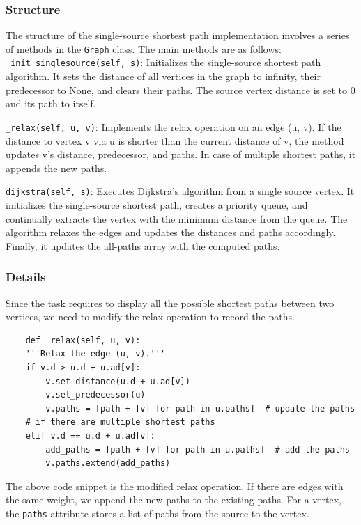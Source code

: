 \documentclass[UTF8]{ctexart}
\begin{document}
\subsubsection*{Structure}
The structure of the single-source shortest path implementation involves a series of methods in the \texttt{Graph} class.
The main methods are as follows:\\
\texttt{\_init\_singlesource(self, s)}: Initializes the single-source shortest path algorithm. It sets the distance of all vertices in the graph to infinity, their predecessor to None, and clears their paths. The source vertex distance is set to 0 and its path to itself.

\texttt{\_relax(self, u, v)}: Implements the relax operation on an edge (u, v). If the distance to vertex v via u is shorter than the current distance of v, the method updates v's distance, predecessor, and paths. In case of multiple shortest paths, it appends the new paths.

\texttt{dijkstra(self, s)}: Executes Dijkstra's algorithm from a single source vertex. It initializes the single-source shortest path, creates a priority queue, and continually extracts the vertex with the minimum distance from the queue. The algorithm relaxes the edges and updates the distances and paths accordingly. Finally, it updates the all-paths array with the computed paths.

\subsubsection*{Details}

Since the task requires to display all the possible shortest paths between two vertices, we need to modify the relax operation to record the paths.
\begin{lstlisting}
    def _relax(self, u, v):
    '''Relax the edge (u, v).'''
    if v.d > u.d + u.ad[v]:
        v.set_distance(u.d + u.ad[v])
        v.set_predecessor(u)
        v.paths = [path + [v] for path in u.paths]  # update the paths
    # if there are multiple shortest paths
    elif v.d == u.d + u.ad[v]:
        add_paths = [path + [v] for path in u.paths]  # add the paths
        v.paths.extend(add_paths)
\end{lstlisting}
The above code snippet is the modified relax operation. If there are edges with the same weight, we append the new paths to the existing paths.
For a vertex, the \texttt{paths} attribute stores a list of paths from the source to the vertex.
\end{document}
